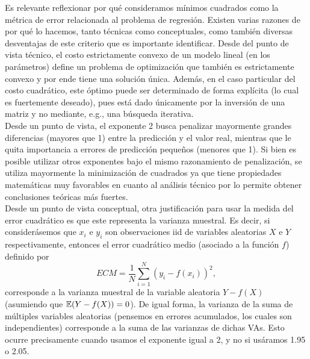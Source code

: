 Es relevante reflexionar por qué consideramos mínimos cuadrados como la métrica de error relacionada al problema de regresión. Existen varias razones de por qué lo hacemos, tanto técnicas como conceptuales, como también diversas desventajas de este criterio que es importante identificar.  Desde del punto de vista técnico, el costo estrictamente convexo de un modelo lineal (en los parámetros) define un problema de optimización que también es estrictamente convexo y por ende tiene una solución única. Además, en el caso particular del costo cuadrático, este óptimo puede ser determinado de forma explícita (lo cual es fuertemente deseado), pues está dado únicamente por la inversión de una matriz y no mediante, e.g., una búsqueda iterativa.\\

Desde un punto de vista, el exponente 2 busca penalizar mayormente grandes diferencias (mayores que 1) entre la predicción y el valor real, mientras que le quita importancia a errores de predicción pequeños (menores que 1). Si bien es posible utilizar otros exponentes bajo el mismo razonamiento de penalización, se utiliza mayormente la minimización de cuadrados ya que tiene propiedades matemáticas muy favorables en cuanto al análisis técnico por lo permite obtener conclusiones teóricas más fuertes.\\

Desde un punto de vista conceptual, otra justificación para usar la medida del  error cuadrático es que este representa la varianza muestral. Es decir, si considerásemos que $x_i$ e $y_i$ son observaciones iid de variables aleatorias $X$ e $Y$ respectivamente, entonces el error cuadrático medio (asociado a la función $f$) definido por
\begin{equation}
	ECM = \frac{1}{N}\sum_{i=1}^N (y_i-f(x_i))^2,
\end{equation}
corresponde a la varianza muestral de la variable aleatoria $Y-f(X)$ (asumiendo que $\operatorname{\mathbb{E}}(Y-f(X))=0$). De igual forma, la varianza de la suma de múltiples variables aleatorias (pensemos en errores acumulados, los cuales son independientes) corresponde a la suma de las varianzas de dichas VAs. Esto ocurre precisamente cuando usamos el exponente igual a 2, y no si usáramos 1.95 o 2.05.\\

